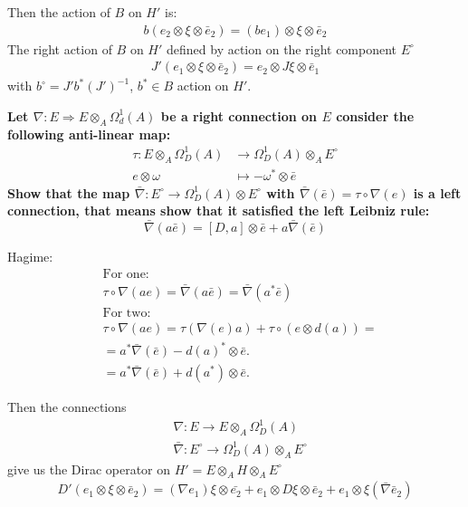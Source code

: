 \documentclass[a4paper]{article}
\newcounter{exercise}
\newenvironment{MyExercise}%
{\begin{mdframed}[style=exercisestyle]}{\end{mdframed}}
\theoremstyle{definition}
\theoremstyle{definition}
\theoremstyle{definition}
\theoremstyle{theorem}
\theoremstyle{theorem}
\begin{document}
Then the action of $B$ on $H'$ is:
\begin{align}
    b(e_2 \otimes \xi \otimes \bar{e}_2 ) = (be_1) \otimes \xi \otimes
    \bar{e}_2
\end{align}
The right action of $B$ on $H'$ defined by action on the right component
$E^\circ$
\begin{align}
    J'(e_1 \otimes \xi \otimes \bar{e}_2) = e_2 \otimes J \xi \otimes
    \bar{e}_1
\end{align}
with $b^\circ = J' b^* (J')^{-1}$, $b^* \in B$ action on $H'$.
\newline


\newpage
\begin{MyExercise}
    \textbf{ Let $\nabla : E \Rightarrow E \otimes _A \Omega _d^1 (A)$ be a right connection on $E$
    consider the following anti-linear map:
    \begin{align}
        \tau : E \otimes_A \Omega _D^1 (A) &\rightarrow \Omega _D^1 (A) \otimes_A E^\circ\\
                e \otimes \omega &\mapsto -\omega ^* \otimes \bar{e}
    \end{align}
    Show that the map $\bar{\nabla} : E^\circ \rightarrow \Omega _D^1(A) \otimes E^\circ$
    with $\bar{\nabla}(\bar{e}) = \tau \circ \nabla(e)$ is a left connection, that means
    show that it satisfied the left Leibniz rule:
    \begin{equation}
        \bar{\nabla}(a\bar{e}) = [D, a] \otimes \bar{e} + a \bar{\nabla}(\bar{e})
    \end{equation}
    }

    Hagime:
    \begin{align}
        &\text{For one:}\\
        &\tau \circ \nabla(ae) = \bar{\nabla}(a\bar{e}) = \bar{\nabla}(a^* \bar{e})\\
        &\text{For two:}\\
         &\tau \circ \nabla(ae) = \tau(\nabla(e)a) + \tau \circ(e \otimes d(a))=\\
         &=a^*\bar{\nabla}(\bar{e}) - d(a)^* \otimes \bar{e}. \\
         &= a^*\bar{\nabla}(\bar{e}) + d(a^*) \otimes \bar{e}.
    \end{align}
\end{MyExercise}
Then the connections
\begin{align}
    &\nabla: E \rightarrow E\otimes _A \Omega _D ^1(A) \\
    &\bar{\nabla}:E^\circ \rightarrow \Omega _D^1(A) \otimes _A E^\circ
\end{align}
give us the Dirac operator on $H' = E \otimes _A H \otimes _A E^\circ$
\begin{align}
    D'(e_1 \otimes \xi \otimes \bar{e}_2) = (\nabla e_1) \xi \otimes
    \bar{e_2}+ e_1 \otimes D\xi \otimes \bar{e}_2 + e_1 \otimes
    \xi(\bar{\nabla}\bar{e}_2)
\end{align}
\end{document}
